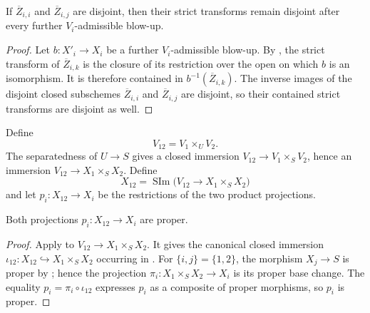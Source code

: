 \begin{lemma}
  \label{lemma:nagata-boundary-disjoint-persists}
  \leanok

  If $\overline Z_{i,i}$ and $\overline Z_{i,j}$ are disjoint, then their
  strict transforms remain disjoint after every further $V_i$-admissible
  blow-up.
\end{lemma}

\begin{proof}
  \leanok
  Let $b\colon X'_i\to X_i$ be a further $V_i$-admissible blow-up.  By
  , the strict transform of
  $\overline Z_{i,k}$ is the closure of its restriction over the open on
  which $b$ is an isomorphism.  It is therefore contained in
  $b^{-1}(\overline Z_{i,k})$.  The inverse images of the disjoint closed
  subschemes $\overline Z_{i,i}$ and $\overline Z_{i,j}$ are disjoint, so
  their contained strict transforms are disjoint as well.
\end{proof}

\begin{definition}
  \label{def:nagata-two-open-comparison-space}
  \leanok

  Define
  \[
    V_{12}=V_1\times_UV_2.
  \]
  The separatedness of $U\to S$ gives a closed immersion
  $V_{12}\to V_1\times_SV_2$, hence an immersion
  $V_{12}\to X_1\times_SX_2$.  Define
  \[
    X_{12}=\operatorname{SIm}
      \bigl(V_{12}\longrightarrow X_1\times_SX_2\bigr)
  \]
  and let $p_i\colon X_{12}\to X_i$ be the restrictions of the two product
  projections.
\end{definition}


\begin{lemma}
  \label{lemma:nagata-comparison-projections-proper}
  \leanok

  Both projections $p_i\colon X_{12}\to X_i$ are proper.
\end{lemma}

\begin{proof}
  \leanok
  Apply  to
  $V_{12}\to X_1\times_SX_2$.  It gives the canonical closed immersion
  $\iota_{12}\colon X_{12}\hookrightarrow X_1\times_SX_2$ occurring in
  .  For
  $\{i,j\}=\{1,2\}$, the morphism $X_j\to S$ is proper by
  ; hence the projection
  $\pi_i\colon X_1\times_SX_2\to X_i$ is its proper base change.  The
  equality $p_i=\pi_i\circ\iota_{12}$ expresses $p_i$ as a composite of
  proper morphisms, so $p_i$ is proper.
\end{proof}


